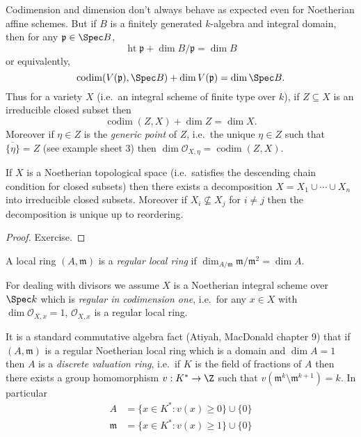 \documentclass[a4paper]{article}
\newcommand{\sh}[1]{\mathcal{#1}} %
\DeclareMathOperator{\codim}{codim} %
\begin{document}
\begin{remark}
  Codimension and dimension don't always behave as expected even for Noetherian affine schemes. But if \(B\) is a finitely generated \(k\)-algebra and integral domain, then for any \(\mathfrak p \in \Spec B\),
  \[
    \operatorname{ht} \mathfrak p + \dim B/\mathfrak p = \dim B
  \]
  or equivalently,
  \[
    \codim(V(\mathfrak p), \Spec B) + \dim V(\mathfrak p) = \dim \Spec B.
  \]
  Thus for a variety \(X\) (i.e.\ an integral scheme of finite type over \(k\)), if \(Z \subseteq X\) is an irreducible closed subset then
  \[
    \codim (Z, X) + \dim Z = \dim X.
  \]
  Moreover if \(\eta \in Z\) is the \emph{generic point} of \(Z\), i.e.\ the unique \(\eta \in Z\) such that \(\overline{\{\eta\}} = Z\) (see example sheet 3) then \(\dim \sh O_{X, \eta} = \codim(Z, X)\).
\end{remark}

\begin{proposition}
  If \(X\) is a Noetherian topological space (i.e.\ satisfies the descending chain condition for closed subsets) then there exists a decomposition \(X = X_1 \cup \cdots \cup X_n\) into irreducible closed subsets. Moreover if \(X_i \nsubseteq X_j\) for \(i \neq j\) then the decomposition is unique up to reordering.
\end{proposition}

\begin{proof}
  Exercise.
\end{proof}

\begin{definition}
  A local ring \((A, \mathfrak m)\) is a \emph{regular local ring} if \(\dim_{A/\mathfrak m} \mathfrak m/\mathfrak m^2 = \dim A\).
\end{definition}

For dealing with divisors we assume \(X\) is a Noetherian integral scheme over \(\Spec k\) which is \emph{regular in codimension one}, i.e.\ for any \(x \in X\) with \(\dim \sh O_{X, x} = 1\), \(\sh O_{X, x}\) is a regular local ring.

\begin{remark}
  It is a standard commutative algebra fact (Atiyah, MacDonald chapter 9) that if \((A, \mathfrak m)\) is a regular Noetherian local ring which is a domain and \(\dim A = 1\) then \(A\) is a \emph{discrete valuation ring}, i.e.\ if \(K\) is the field of fractions of \(A\) then there exists a group homomorphism \(v: K^* \to \Z\) such that \(v(\mathfrak m^k \setminus \mathfrak m^{k + 1}) = k\). In particular
  \begin{align*}
    A &= \{x \in K^*: v(x) \geq 0\} \cup \{0\} \\
    \mathfrak m &= \{x \in K^*: v(x) \geq 1\} \cup \{0\}
  \end{align*}
\end{remark}
\end{document}
